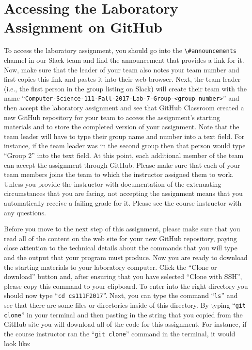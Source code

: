 \documentclass[11pt]{article}
\newcommand{\command}[1]{``\lstinline{#1}''}
\newcommand{\channel}[1]{\lstinline{#1}}
\begin{document}
\section*{Accessing the Laboratory Assignment on GitHub}

To access the laboratory assignment, you should go into the \channel{\#announcements} channel in our Slack team and find
the announcement that provides a link for it. Now, make sure that the leader of your team also notes your team number
and first copies this link and pastes it into their web browser. Next, the team leader (i.e., the first person in the
group listing on Slack) will create their team with the name \command{Computer-Science-111-Fall-2017-Lab-7-Group-<group
number>} and then accept the laboratory assignment and see that GitHub Classroom created a new GitHub repository for
your team to access the assignment's starting materials and to store the completed version of your assignment. Note that
the team leader will have to type their group name and number into a text field. For instance, if the team leader was in
the second group then that person would type ``Group 2'' into the text field. At this point, each additional member of
the team can accept the assignment through GitHub. Please make sure that each of your team members joins the team to
which the instructor assigned them to work. Unless you provide the instructor with documentation of the extenuating
circumstances that you are facing, not accepting the assignment means that you automatically receive a failing grade for
it. Please see the course instructor with any questions.

Before you move to the next step of this assignment, please make sure that you read all of the content on the web site
for your new GitHub repository, paying close attention to the technical details about the commands that you will type
and the output that your program must produce. Now you are ready to download the starting materials to your laboratory
computer. Click the ``Clone or download'' button and, after ensuring that you have selected ``Clone with SSH'', please
copy this command to your clipboard. To enter into the right directory you should now type \command{cd cs111F2017}.
Next, you can type the command \command{ls} and see that there are some files or directories inside of this directory.
By typing \command{git clone} in your terminal and then pasting in the string that you copied from the GitHub site you
will download all of the code for this assignment. For instance, if the course instructor ran the \command{git clone}
command in the terminal, it would look like:
\end{document}
